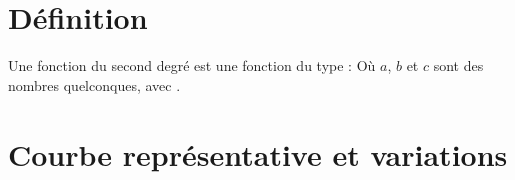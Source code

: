 \documentclass[12pt,a4paper]{article}
\date{}
\title{}
\newcommand{\disp}{true}
\begin{document}
{}

\section{Définition}

\begin{mydef}
	Une fonction du second degré est une fonction du type :
	Où $a$, $b$ et $c$ sont des nombres quelconques, avec .
\end{mydef}


\begin{myact}{1}
		
	\actOne{\disp}	
	
\end{myact}	

\section{Courbe représentative et variations}

\begin{myact}{2}
	\actTwo
\end{myact}
\end{document}
